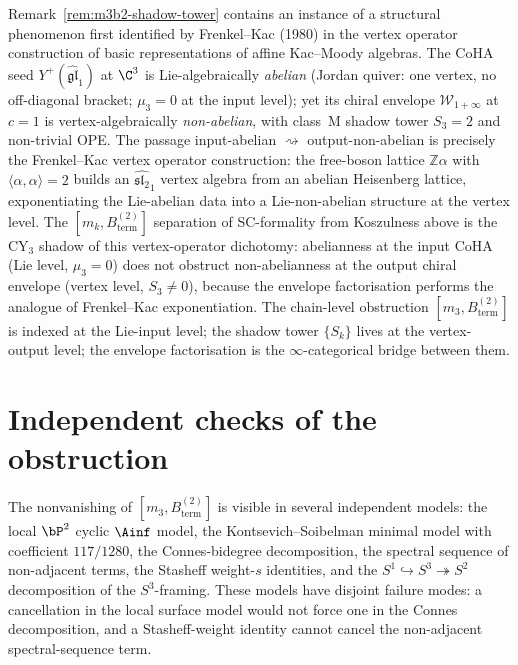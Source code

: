 \begin{remark}
\label{rem:m3b2-frenkel-kac}
Remark~\ref{rem:m3b2-shadow-tower} contains an instance of a
structural phenomenon first identified by Frenkel--Kac (1980) in
the vertex operator construction of basic representations of
affine Kac--Moody algebras. The CoHA seed $Y^+(\widehat{\mathfrak{gl}}_1)$
at $\C^3$ is Lie-algebraically \emph{abelian} (Jordan quiver: one
vertex, no off-diagonal bracket; $\mu_3 = 0$ at the input level);
yet its chiral envelope
$\mathcal{W}_{1+\infty}$ at $c = 1$ is vertex-algebraically
\emph{non-abelian}, with class~M shadow tower $S_3 = 2$ and
non-trivial OPE. The passage input-abelian $\rightsquigarrow$ output-non-abelian
is precisely the Frenkel--Kac vertex operator construction:
the free-boson lattice $\mathbb{Z}\alpha$ with $\langle \alpha,
\alpha \rangle = 2$ builds an $\widehat{\mathfrak{sl}_2}_1$ vertex
algebra from an abelian Heisenberg lattice, exponentiating the
Lie-abelian data into a Lie-non-abelian structure at the vertex
level. The $[m_k, B^{(2)}_{\mathrm{term}}]$ separation of SC-formality from
Koszulness above is the CY$_3$ shadow of this vertex-operator
dichotomy: abelianness at the input CoHA (Lie level,
$\mu_3 = 0$) does not obstruct non-abelianness at the output
chiral envelope (vertex level, $S_3 \neq 0$), because the
envelope factorisation performs the analogue of Frenkel--Kac
exponentiation. The chain-level obstruction
$[m_3, B^{(2)}_{\mathrm{term}}]$ is indexed at the Lie-input level; the shadow
tower $\{S_k\}$ lives at the vertex-output level; the envelope
factorisation is the $\infty$-categorical bridge between them.
\end{remark}


\section{Independent checks of the obstruction}
\label{sec:m3b2-independent-checks}

The nonvanishing of $[m_3,B^{(2)}_{\mathrm{term}}]$ is visible in
several independent models: the local $\bP^2$ cyclic $\Ainf$ model, the
Kontsevich--Soibelman minimal model with coefficient $117/1280$, the
Connes-bidegree decomposition, the spectral sequence of non-adjacent
terms, the Stasheff weight-$s$ identities, and the
$S^1\hookrightarrow S^3\twoheadrightarrow S^2$ decomposition of the
$S^3$-framing.  These models have disjoint failure modes: a cancellation
in the local surface model would not force one in the Connes
decomposition, and a Stasheff-weight identity cannot cancel the
non-adjacent spectral-sequence term.

